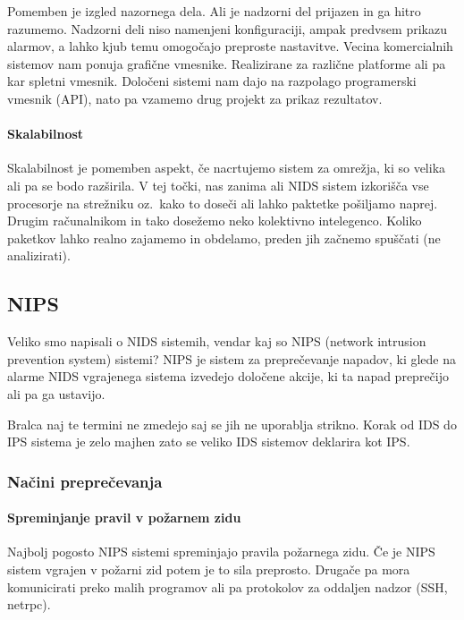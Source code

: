 \documentclass[12pt]{article}
\begin{document}
Pomemben je izgled nazornega dela. Ali je nadzorni del prijazen in ga hitro razumemo.
Nadzorni deli niso namenjeni konfiguraciji, ampak predvsem prikazu alarmov, a lahko kjub temu omogočajo preproste nastavitve.
Vecina komercialnih sistemov nam ponuja grafične vmesnike. Realizirane za različne platforme ali pa kar spletni vmesnik.
Določeni sistemi nam dajo na razpolago programerski vmesnik (API), nato pa vzamemo drug projekt za prikaz rezultatov.



\paragraph{Skalabilnost} %

Skalabilnost je pomemben aspekt, če nacrtujemo sistem za omrežja, ki so velika ali pa se bodo razširila. 
V tej točki, nas zanima ali NIDS sistem izkorišča vse procesorje na strežniku oz.\ kako to doseči ali lahko paktetke pošiljamo naprej. Drugim računalnikom in tako dosežemo neko kolektivno intelegenco.
Koliko paketkov lahko realno zajamemo in obdelamo, preden jih začnemo spuščati (ne analizirati).


\subsection{NIPS}

Veliko smo napisali o NIDS sistemih, vendar kaj so NIPS (network intrusion prevention system) sistemi?
NIPS je sistem za preprečevanje napadov, ki glede na alarme NIDS vgrajenega sistema izvedejo določene akcije, ki ta napad preprečijo ali pa ga ustavijo.

Bralca naj te termini ne zmedejo saj se jih ne uporablja strikno. Korak od IDS do IPS sistema je zelo majhen zato se veliko IDS sistemov deklarira kot IPS.

\subsubsection{Načini preprečevanja} %

\paragraph{Spreminjanje pravil v požarnem zidu} %

Najbolj pogosto NIPS sistemi spreminjajo pravila požarnega zidu.
Če je NIPS sistem vgrajen v požarni zid potem je to sila preprosto.
Drugače pa mora komunicirati preko malih programov ali pa protokolov za oddaljen nadzor (SSH, netrpc).
\end{document}
